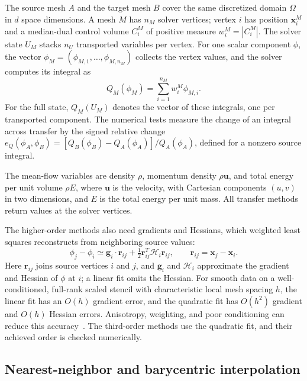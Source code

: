 \documentclass[a4paper,fleqn]{cas-sc}
\begin{document}
The source mesh $A$ and the target mesh $B$ cover the same discretized domain $\Omega$ in $d$ space dimensions. A mesh $M$ has $n_M$ solver vertices; vertex $i$ has position $\boldsymbol x_i^M$ and a median-dual control volume $C_i^M$ of positive measure $w_i^M=|C_i^M|$. The solver state $U_M$ stacks $n_U$ transported variables per vertex. For one scalar component $\phi$, the vector $\phi_M=(\phi_{M,1},\ldots,\phi_{M,n_M})$ collects the vertex values, and the solver computes its integral as
\begin{equation}
 Q_M(\phi_M)=\sum_{i=1}^{n_M}w_i^M\phi_{M,i}.
 \label{eq:fv-discrete-integral}
\end{equation}
For the full state, $Q_M(U_M)$ denotes the vector of these integrals, one per transported component. The numerical tests measure the change of an integral across transfer by the signed relative change $e_Q(\phi_A,\phi_B)=[Q_B(\phi_B)-Q_A(\phi_A)]/Q_A(\phi_A)$, defined for a nonzero source integral.

The mean-flow variables are density $\rho$, momentum density $\rho\boldsymbol u$, and total energy per unit volume $\rho E$, where $\boldsymbol u$ is the velocity, with Cartesian components $(u,v)$ in two dimensions, and $E$ is the total energy per unit mass. All transfer methods return values at the solver vertices.

The higher-order methods also need gradients and Hessians, which weighted least squares reconstructs from neighboring source values:
\begin{equation}
 \phi_j-\phi_i\simeq \boldsymbol g_i\cdot\boldsymbol r_{ij}
              +\tfrac12\boldsymbol r_{ij}^{T}\mathcal H_i\boldsymbol r_{ij},
 \qquad \boldsymbol r_{ij}=\boldsymbol x_j-\boldsymbol x_i.
 \label{eq:wls-polynomial}
\end{equation}
Here $\boldsymbol r_{ij}$ joins source vertices $i$ and $j$, and $\boldsymbol g_i$ and $\mathcal H_i$ approximate the gradient and Hessian of $\phi$ at $i$; a linear fit omits the Hessian. For smooth data on a well-conditioned, full-rank scaled stencil with characteristic local mesh spacing $h$, the linear fit has an $O(h)$ gradient error, and the quadratic fit has $O(h^2)$ gradient and $O(h)$ Hessian errors. Anisotropy, weighting, and poor conditioning can reduce this accuracy~\cite{BarthFrederickson1990,Barth1993,Mavriplis2003,DiskinThomas2008}. The third-order methods use the quadratic fit, and their achieved order is checked numerically.

\subsection{Nearest-neighbor and barycentric interpolation}
\label{sec:point-transfer}
\label{sec:barycentric-transfer}
\end{document}
